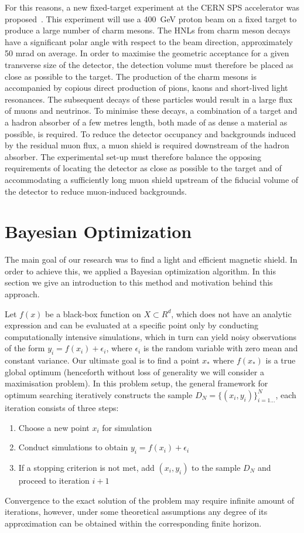 \documentclass[a4paper]{jpconf}
\theoremstyle{my_theorem_style}
\numberwithin{equation}{section}
\begin{document}
For this reasons, a new fixed-target experiment at the CERN SPS accelerator was proposed~\cite{Bonivento:2013jag}. This experiment will use a 400~GeV proton beam on a fixed target to produce a large number of charm mesons. The HNLs from charm meson decays have a significant polar angle with respect to the beam direction, approximately 50 mrad on average. In order to maximise the geometric
acceptance for a given transverse size of the detector, the detection volume must therefore be placed
as close as possible to the target. The production of the charm mesons is accompanied by copious direct production of pions, kaons and short-lived light resonances. The subsequent decays of these particles would result in a large flux of muons and neutrinos. To minimise these decays, a combination of a target and a hadron absorber of a few metres length, both made of as dense a material as possible, is required. To reduce the detector occupancy and backgrounds induced by the residual muon flux, a muon shield is required downstream of the hadron absorber. The experimental set-up must therefore balance the opposing requirements of locating the detector as close as possible to the target and of accommodating a sufficiently long muon shield upstream of the fiducial volume of the detector to reduce muon-induced backgrounds.

\section{Bayesian Optimization}
The main goal of our research was to find a light and efficient
magnetic shield. In order to achieve this, we applied a Bayesian optimization algorithm. In this section we give an introduction to this method and motivation behind this approach.

Let $f(x)$ be a black-box function on $X \subset R^d$, which does not have an analytic expression and can be evaluated at a specific point only by conducting computationally intensive simulations, which in turn can yield noisy observations of the form $y_i = f(x_i) + \epsilon_i$, where $\epsilon_i$ is the random variable with zero mean and constant variance. Our ultimate goal is to find a point $x_*$ where $f(x_*)$ is a true global optimum (henceforth without loss of generality we will consider a maximisation problem). In this problem setup, the general framework for optimum searching iteratively constructs the sample $D_N = \{(x_i, y_i)\}_{i=1…}^N$, each iteration consists of three steps:
\begin{enumerate}
\item \label{point_choosing} Choose a new point $x_{i}$ for simulation 
\item Conduct simulations to obtain $y_{i} = f(x_{i}) + \epsilon_i$
\item If a stopping criterion is not met, add $(x_{i}, y_{i})$ to the sample $D_N$ and proceed to iteration $i+1$
\end{enumerate}
Convergence to the exact solution of the problem may require infinite amount of iterations, however, under some theoretical assumptions any degree of its approximation can be obtained within the corresponding finite horizon.
\end{document}
